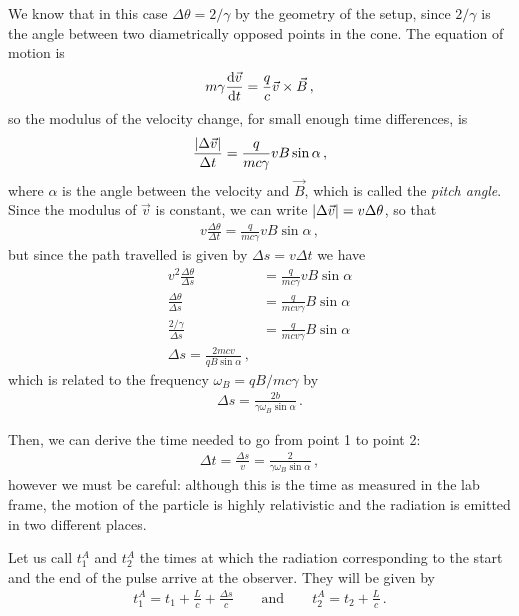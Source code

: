 \documentclass[main.tex]{subfiles}
\begin{document}
We know that in this case \(\Delta \theta  = 2 / \gamma \) by the geometry of the setup, since \(2 / \gamma \) is the angle between two diametrically opposed points in the cone. 
The equation of motion is 
%
\begin{align}
m \gamma \dv{\vec{v}}{t} = \frac{q}{c} \vec{v} \times \vec{B}
\,,
\end{align}
%
so the modulus of the velocity change, for small enough time differences, is
%
\begin{align}
\frac{ \abs{ \Delta \vec{v}}}{ \Delta t} = \frac{q}{mc \gamma } v B \sin \alpha 
\,,
\end{align}
%
where \(\alpha \) is the angle between the velocity and \(\vec{B}\), which is called the \emph{pitch angle}. 
Since the modulus of \(\vec{v}\) is constant, we can write \(\abs{ \Delta \vec{v}} = v \Delta \theta\), so that 
%
\begin{align}
v \frac{ \Delta \theta }{\Delta t} = \frac{q}{mc \gamma } vB \sin \alpha 
\,,
\end{align}
%
but since the path travelled is given by \(\Delta s = v \Delta t\) we have 
%
\begin{align}
v^2 \frac{ \Delta \theta }{ \Delta s} &= \frac{q}{mc \gamma } v B \sin \alpha  \\
 \frac{ \Delta \theta }{ \Delta s} &= \frac{q}{mc v \gamma } B \sin \alpha \\
 \frac{ 2/ \gamma  }{ \Delta s} &= \frac{q}{mc v \gamma } B \sin \alpha \\
 \Delta s = \frac{2 mc v}{q B \sin \alpha }
\,,
\end{align}
%
which is related to the frequency \(\omega _B = q B / mc \gamma \) by 
%
\begin{align}
\Delta s = \frac{2 b}{\gamma \omega _B \sin \alpha  }
\,.
\end{align}

Then, we can derive the time needed to go from point 1 to point 2: 
%
\begin{align}
\Delta t = \frac{\Delta s}{v} = \frac{2}{\gamma \omega _B \sin \alpha }
\,,
\end{align}
%
however we must be careful: although this is the time as measured in the lab frame, the motion of the particle is highly relativistic and the radiation is emitted in two different places. 

Let us call \(t_1^A\) and \(t_2^A\) the times at which the radiation corresponding to  the start and the end of the pulse arrive at the observer. 
They will be given by 
%
\begin{align}
t_1^{A} = t_1 + \frac{L}{c} + \frac{\Delta s}{c} 
\qquad \text{and} \qquad
t_2^{A} = t_2 + \frac{L}{c}  
\,.
\end{align}
\end{document}
